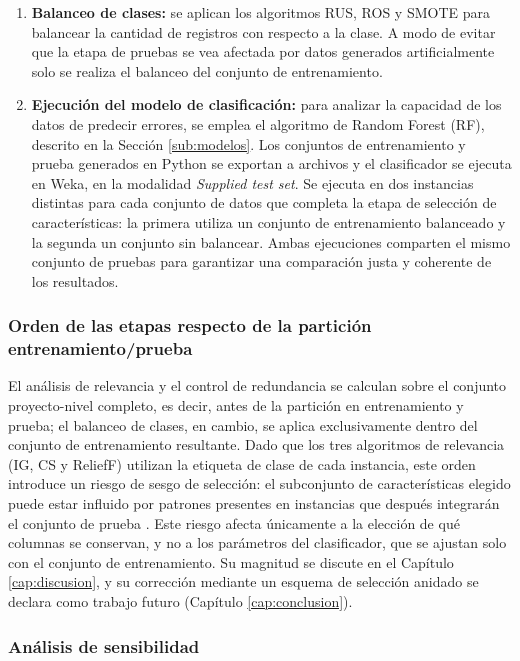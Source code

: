 \begin{enumerate}
\begin{enumerate}
\item \textbf{Balanceo de clases:} se aplican los algoritmos RUS, ROS y SMOTE para balancear la cantidad de registros con respecto a la clase. A modo de evitar que la etapa de pruebas se vea afectada por datos generados artificialmente solo se realiza el balanceo del conjunto de entrenamiento.
\item \textbf{Ejecución del modelo de clasificación:} para analizar la capacidad de los datos de predecir errores, se emplea el algoritmo de Random Forest (RF), descrito en la Sección \ref{sub:modelos}. Los conjuntos de entrenamiento y prueba generados en Python se exportan a archivos y el clasificador se ejecuta en Weka, en la modalidad \textit{Supplied test set}. Se ejecuta en dos instancias distintas para cada conjunto de datos que completa la etapa de selección de características: la primera utiliza un conjunto de entrenamiento balanceado y la segunda un conjunto sin balancear. Ambas ejecuciones comparten el mismo conjunto de pruebas para garantizar una comparación justa y coherente de los resultados.

\end{enumerate}
\end{enumerate}

\subsubsection{Orden de las etapas respecto de la partición entrenamiento/prueba}

El análisis de relevancia y el control de redundancia se calculan sobre el conjunto proyecto-nivel completo, es decir, antes de la partición en entrenamiento y prueba; el balanceo de clases, en cambio, se aplica exclusivamente dentro del conjunto de entrenamiento resultante. Dado que los tres algoritmos de relevancia (IG, CS y ReliefF) utilizan la etiqueta de clase de cada instancia, este orden introduce un riesgo de sesgo de selección: el subconjunto de características elegido puede estar influido por patrones presentes en instancias que después integrarán el conjunto de prueba \cite{ambroise2002,cawley2010}. Este riesgo afecta únicamente a la elección de qué columnas se conservan, y no a los parámetros del clasificador, que se ajustan solo con el conjunto de entrenamiento. Su magnitud se discute en el Capítulo \ref{cap:discusion}, y su corrección mediante un esquema de selección anidado se declara como trabajo futuro (Capítulo \ref{cap:conclusion}).

\subsubsection{Análisis de sensibilidad}

